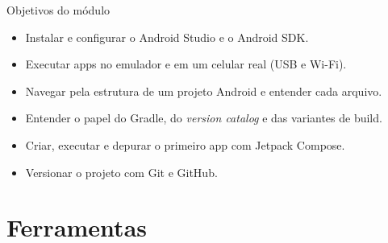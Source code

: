 \documentclass[aspectratio=169,10pt]{beamer}
\begin{document}
\capa

\begin{frame}{Objetivos do módulo}
  \begin{conceito}
    \begin{itemize}
      \item Instalar e configurar o Android Studio e o Android SDK.
      \item Executar apps no emulador e em um celular real (USB e Wi-Fi).
      \item Navegar pela estrutura de um projeto Android e entender cada arquivo.
      \item Entender o papel do Gradle, do \emph{version catalog} e das variantes de build.
      \item Criar, executar e depurar o primeiro app com Jetpack Compose.
      \item Versionar o projeto com Git e GitHub.
    \end{itemize}
  \end{conceito}
\end{frame}

\sumario



\section{Ferramentas}
\end{document}
